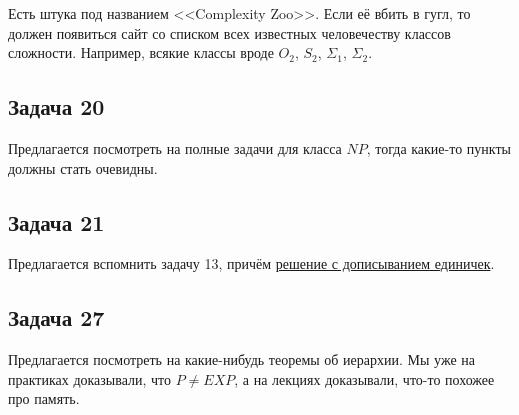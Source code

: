 	Есть штука под названием <<Complexity Zoo>>.
	Если её вбить в гугл, то должен появиться сайт со списком всех известных человечеству классов сложности.
	Например, всякие классы вроде $O_2$, $S_2$, $\Sigma_1$, $\Sigma_2$.

\subsection{Задача 20}
	Предлагается посмотреть на полные задачи для класса $NP$, тогда какие-то пункты должны стать очевидны.

\subsection{Задача 21}
	Предлагается вспомнить задачу 13, причём \hyperref[prob13_sol2]{решение с дописыванием единичек}.

\subsection{Задача 27}
	Предлагается посмотреть на какие-нибудь теоремы об иерархии.
	Мы уже на практиках доказывали, что $P \neq EXP$, а на лекциях доказывали, что-то похожее про память.
